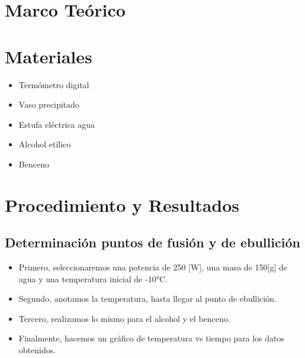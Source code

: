 \documentclass[a4paper, 12p]{article}
\begin{document}
\section{Marco Teórico}





\section{Materiales}
\begin{itemize}
      \item Termómetro digital
      \item Vaso precipitado
      \item Estufa eléctrica agua
      \item Alcohol etílico
      \item Benceno
\end{itemize}






\section{Procedimiento y Resultados}






\subsection{Determinación puntos de fusión y de ebullición}
\begin{itemize}
      \item Primero, seleccionaremos una potencia de 250 [W], una masa de 150[g] de agua y una temperatura inicial de -10°C.
      \item Segundo, anotamos la temperatura, hasta llegar al punto de ebullición.
      \item Tercero, realizamos lo mismo para el alcohol y el benceno.
      \item Finalmente, hacemos un gráfico de temperatura vs tiempo para los datos obtenidos.
\end{itemize}
\end{document}
